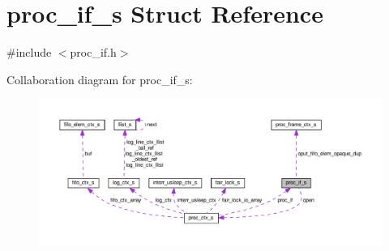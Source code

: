 \hypertarget{structproc__if__s}{}\section{proc\+\_\+if\+\_\+s Struct Reference}
\label{structproc__if__s}


{\ttfamily \#include $<$proc\+\_\+if.\+h$>$}



Collaboration diagram for proc\+\_\+if\+\_\+s\+:\nopagebreak
\begin{figure}[H]
\begin{center}
\leavevmode
\includegraphics[width=350pt]{structproc__if__s__coll__graph}
\end{center}
\end{figure}
